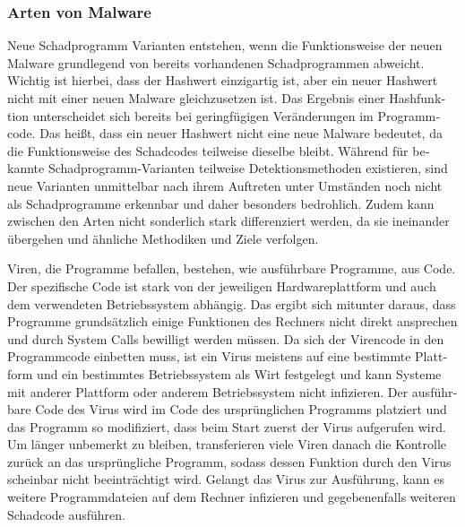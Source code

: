 \begin{otherlanguage}{ngerman}
\subsubsection{Arten von Malware}
Neue Schadprogramm Varianten entstehen, wenn die Funktionsweise der neuen Malware grundlegend von bereits vorhandenen Schadprogrammen abweicht. Wichtig ist hierbei, dass der Hashwert einzigartig ist, aber ein neuer Hashwert nicht mit einer neuen Malware gleichzusetzen ist. Das Ergebnis einer Hashfunktion unterscheidet sich bereits bei geringfügigen Veränderungen im Programmcode. Das heißt, dass ein neuer Hashwert nicht eine neue Malware bedeutet, da die Funktionsweise des Schadcodes teilweise dieselbe bleibt. 
\newline Während für bekannte Schadprogramm-Varianten teilweise Detektionsmethoden existieren, sind neue Varianten unmittelbar nach ihrem Auftreten unter Umständen noch nicht als Schadprogramme erkennbar und daher besonders bedrohlich. 
\newline Zudem kann zwischen den Arten nicht sonderlich stark differenziert werden, da sie ineinander übergehen und ähnliche Methodiken und Ziele verfolgen.
\newpage 

    \newline Viren, die Programme befallen, bestehen, wie ausführbare Programme, aus Code. 
    \newline Der spezifische Code ist stark von der jeweiligen Hardwareplattform und auch dem
    verwendeten Betriebssystem abhängig. Das ergibt sich mitunter daraus, dass Programme grundsätzlich einige Funktionen des Rechners nicht direkt ansprechen und durch System Calls bewilligt werden müssen.
    \newline Da sich der Virencode in den Programmcode einbetten muss, ist ein Virus meistens auf eine bestimmte Plattform und ein bestimmtes Betriebssystem als Wirt festgelegt und kann Systeme mit anderer Plattform oder anderem Betriebssystem nicht infizieren. 
    \newline Der ausführbare Code des Virus wird im Code des ursprünglichen Programms platziert und das Programm so modifiziert, dass beim Start zuerst der Virus aufgerufen wird.
    \newline Um länger unbemerkt zu bleiben, transferieren viele Viren danach die Kontrolle zurück an das ursprüngliche Programm, sodass dessen Funktion durch den Virus scheinbar nicht beeinträchtigt wird. Gelangt das Virus zur Ausführung, kann es weitere Programmdateien auf dem Rechner infizieren und gegebenenfalls weiteren Schadcode ausführen.
    

\end{otherlanguage}
